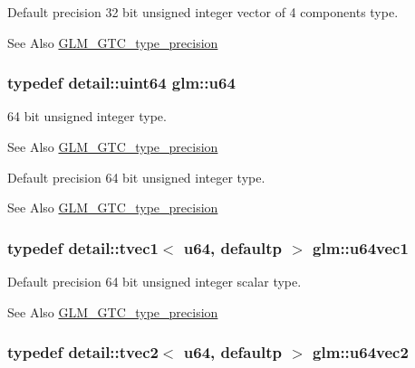 Default precision 32 bit unsigned integer vector of 4 components type. \begin{DoxySeeAlso}{See Also}
\hyperlink{group__gtc__type__precision}{G\-L\-M\-\_\-\-G\-T\-C\-\_\-type\-\_\-precision} 
\end{DoxySeeAlso}
\hypertarget{group__gtc__type__precision_ga71cedd4972f9cb1a5e14dfe5ab83ecd7}{
\subsubsection[{u64}]{\setlength{\rightskip}{0pt plus 5cm}typedef detail\-::uint64 {\bf glm\-::u64}}}\label{group__gtc__type__precision_ga71cedd4972f9cb1a5e14dfe5ab83ecd7}
64 bit unsigned integer type. \begin{DoxySeeAlso}{See Also}
\hyperlink{group__gtc__type__precision}{G\-L\-M\-\_\-\-G\-T\-C\-\_\-type\-\_\-precision}
\end{DoxySeeAlso}
Default precision 64 bit unsigned integer type. \begin{DoxySeeAlso}{See Also}
\hyperlink{group__gtc__type__precision}{G\-L\-M\-\_\-\-G\-T\-C\-\_\-type\-\_\-precision} 
\end{DoxySeeAlso}
\hypertarget{group__gtc__type__precision_ga7d5145019ad749f4becd39ce8e786a5f}{
\subsubsection[{u64vec1}]{\setlength{\rightskip}{0pt plus 5cm}typedef detail\-::tvec1$<$ u64, defaultp $>$ {\bf glm\-::u64vec1}}}\label{group__gtc__type__precision_ga7d5145019ad749f4becd39ce8e786a5f}
Default precision 64 bit unsigned integer scalar type. \begin{DoxySeeAlso}{See Also}
\hyperlink{group__gtc__type__precision}{G\-L\-M\-\_\-\-G\-T\-C\-\_\-type\-\_\-precision} 
\end{DoxySeeAlso}
\hypertarget{group__gtc__type__precision_gaffa78d655fd98b33e47043e2bd38641b}{
\subsubsection[{u64vec2}]{\setlength{\rightskip}{0pt plus 5cm}typedef detail\-::tvec2$<$ u64, defaultp $>$ {\bf glm\-::u64vec2}}}\label{group__gtc__type__precision_gaffa78d655fd98b33e47043e2bd38641b}
